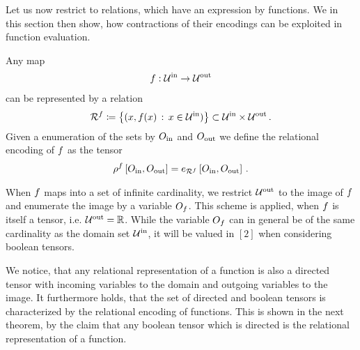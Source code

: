 
Let us now restrict to relations, which have an expression by functions.
We in this section then show, how contractions of their encodings can be exploited in function evaluation.



\begin{definition}
    \label{def:functionRelationEncoding}
    Any map
    \begin{align*}
        f : \mathcal{U}^{\mathrm{in}} \rightarrow \mathcal{U}^{\mathrm{out}}
    \end{align*}
    can be represented by a relation
    \begin{align*}
        \mathcal{R}^{f} \coloneqq \left\{ (x,f(x) \, : \, x \in\mathcal{U}^{\mathrm{in}} )\right\} \subset \mathcal{U}^{\mathrm{in}} \times \mathcal{U}^{\mathrm{out}} \, .
    \end{align*}
    Given a enumeration of the sets by $O_{\mathrm{in}}$ and $O_{\mathrm{out}}$ we define the relational encoding of $f$ as the tensor
    \begin{align*}
        \rho^{f}\left[O_{\mathrm{in}},O_{\mathrm{out}}\right]
        = e_{\mathcal{R}^{f}}\left[O_{\mathrm{in}},O_{\mathrm{out}}\right]  \, .
    \end{align*}
\end{definition}

\begin{remark}
    When $f$ maps into a set of infinite cardinality, we restrict $\mathcal{U}^{\mathrm{out}}$ to the image of $f$ and enumerate the image by a variable $O_{f}$.
    This scheme is applied, when $f$ is itself a tensor, i.e. $\mathcal{U}^{\mathrm{out}}=\mathbb{R}$.
    While the variable $O_{f}$ can in general be of the same cardinality as the domain set $\mathcal{U}^{\mathrm{in}}$, it will be valued in $[2]$ when considering boolean tensors.
\end{remark}

We notice, that any relational representation of a function is also a directed tensor with incoming variables to the domain and outgoing variables to the image.
It furthermore holds, that the set of directed and boolean tensors is characterized by the relational encoding of functions.
This is shown in the next theorem, by the claim that any boolean tensor which is directed is the relational representation of a function.

